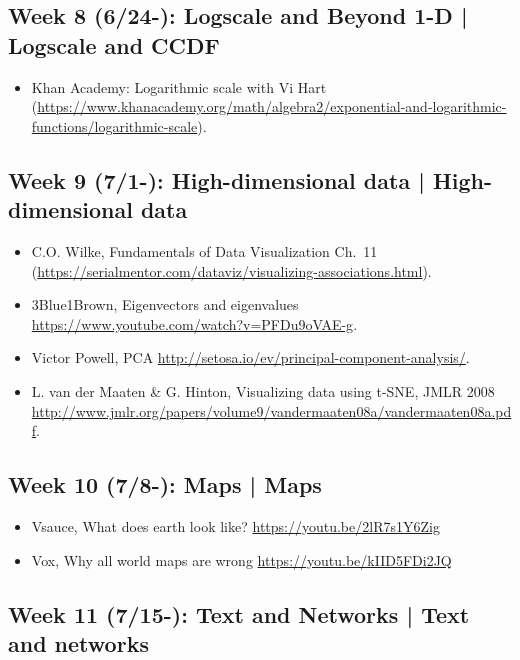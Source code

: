 \documentclass[11pt,article,oneside]{memoir} %
\begin{document}
\subsection{Week 8 (6/24-): Logscale and Beyond 1-D | Logscale and CCDF}%

\begin{itemize}\itemsep0em 
\item Khan Academy: Logarithmic scale with Vi Hart (\url{https://www.khanacademy.org/math/algebra2/exponential-and-logarithmic-functions/logarithmic-scale}). 
\end{itemize}	
\subsection{Week 9 (7/1-): High-dimensional data | High-dimensional data }%

\begin{itemize}\itemsep0em 
\item C.O. Wilke, Fundamentals of Data Visualization Ch.~11 (\url{https://serialmentor.com/dataviz/visualizing-associations.html}). 
\item 3Blue1Brown, Eigenvectors and eigenvalues \url{https://www.youtube.com/watch?v=PFDu9oVAE-g}. 
\item Victor Powell, PCA \url{http://setosa.io/ev/principal-component-analysis/}.
\item L. van der Maaten \& G. Hinton, Visualizing data using t-SNE, JMLR 2008 \url{http://www.jmlr.org/papers/volume9/vandermaaten08a/vandermaaten08a.pdf}.
\end{itemize}	

\subsection{Week 10 (7/8-): Maps | Maps }%

\begin{itemize}\itemsep0em 
\item Vsauce, What does earth look like? \url{https://youtu.be/2lR7s1Y6Zig}
\item Vox, Why all world maps are wrong \url{https://youtu.be/kIID5FDi2JQ}
\end{itemize}	
\subsection{Week 11 (7/15-): Text and Networks | Text and networks} %
\end{document}
